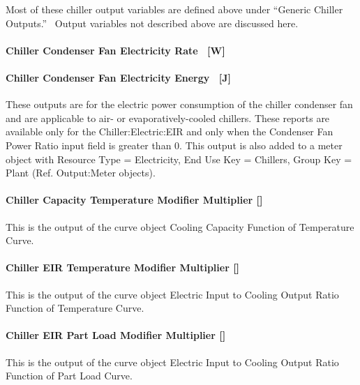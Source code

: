 Most of these chiller output variables are defined above under ``Generic Chiller Outputs.''~ Output variables not described above are discussed here.

\paragraph{Chiller Condenser Fan Electricity Rate ~{[}W{]}}\label{chiller-condenser-fan-electric-power-w}

\paragraph{Chiller Condenser Fan Electricity Energy ~{[}J{]}}\label{chiller-condenser-fan-electric-energy-j}

These outputs are for the electric power consumption of the chiller condenser fan and are applicable to air- or evaporatively-cooled chillers. These reports are available only for the Chiller:Electric:EIR and only when the Condenser Fan Power Ratio input field is greater than 0. This output is also added to a meter object with Resource Type = Electricity, End Use Key = Chillers, Group Key = Plant (Ref. Output:Meter objects).

\paragraph{Chiller Capacity Temperature Modifier Multiplier {[]}}\label{chiller-capacity-temperature-modifier-multiplier}

This is the output of the curve object Cooling Capacity Function of Temperature Curve.

\paragraph{Chiller EIR Temperature Modifier Multiplier {[]}}\label{chiller-eir-temperature-modifier-multiplier}

This is the output of the curve object Electric Input to Cooling Output Ratio Function of Temperature Curve.

\paragraph{Chiller EIR Part Load Modifier Multiplier {[]}}\label{chiller-eir-part-load-modifier-multiplier}

This is the output of the curve object Electric Input to Cooling Output Ratio Function of Part Load Curve.

